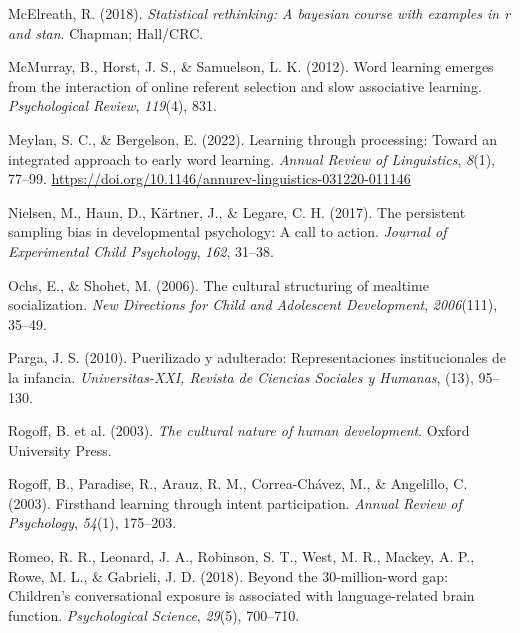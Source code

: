 \documentclass[
  man,floatsintext]{apa6}
\newlength{\cslhangindent}
\newlength{\cslentryspacingunit} %
\newenvironment{CSLReferences}[2] %
 {%
  \setlength{\parindent}{0pt}
  \ifodd #1
  \let\oldpar\par
  \def\par{\hangindent=\cslhangindent\oldpar}
  \fi
  \setlength{\parskip}{#2\cslentryspacingunit}
 }%
 {}
\begin{document}
\begin{CSLReferences}{1}{0}
\leavevmode{}%
McElreath, R. (2018). \emph{Statistical rethinking: A bayesian course with examples in r and stan}. Chapman; Hall/CRC.

\leavevmode{}%
McMurray, B., Horst, J. S., \& Samuelson, L. K. (2012). Word learning emerges from the interaction of online referent selection and slow associative learning. \emph{Psychological Review}, \emph{119}(4), 831.

\leavevmode{}%
Meylan, S. C., \& Bergelson, E. (2022). Learning through processing: Toward an integrated approach to early word learning. \emph{Annual Review of Linguistics}, \emph{8}(1), 77--99. \url{https://doi.org/10.1146/annurev-linguistics-031220-011146}

\leavevmode{}%
Nielsen, M., Haun, D., Kärtner, J., \& Legare, C. H. (2017). The persistent sampling bias in developmental psychology: A call to action. \emph{Journal of Experimental Child Psychology}, \emph{162}, 31--38.

\leavevmode{}%
Ochs, E., \& Shohet, M. (2006). The cultural structuring of mealtime socialization. \emph{New Directions for Child and Adolescent Development}, \emph{2006}(111), 35--49.

\leavevmode{}%
Parga, J. S. (2010). Puerilizado y adulterado: Representaciones institucionales de la infancia. \emph{Universitas-XXI, Revista de Ciencias Sociales y Humanas}, (13), 95--130.

\leavevmode{}%
Rogoff, B. et al. (2003). \emph{The cultural nature of human development}. Oxford University Press.

\leavevmode{}%
Rogoff, B., Paradise, R., Arauz, R. M., Correa-Chávez, M., \& Angelillo, C. (2003). Firsthand learning through intent participation. \emph{Annual Review of Psychology}, \emph{54}(1), 175--203.

\leavevmode{}%
Romeo, R. R., Leonard, J. A., Robinson, S. T., West, M. R., Mackey, A. P., Rowe, M. L., \& Gabrieli, J. D. (2018). Beyond the 30-million-word gap: Children's conversational exposure is associated with language-related brain function. \emph{Psychological Science}, \emph{29}(5), 700--710.


\end{CSLReferences}
\end{document}
